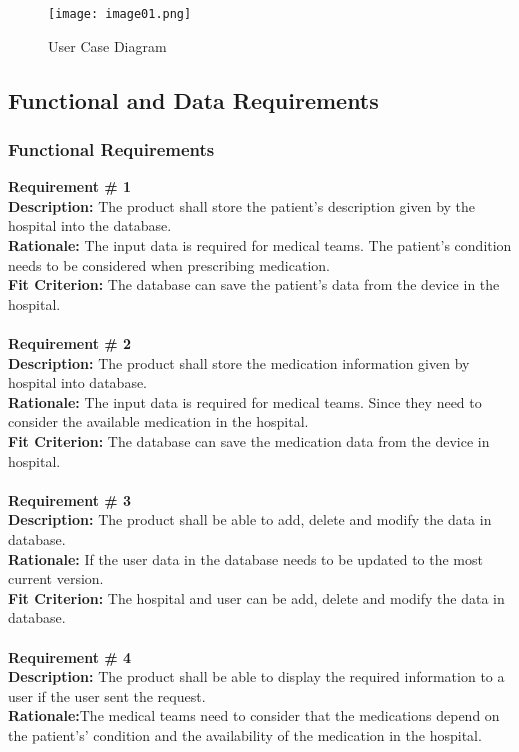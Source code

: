 \documentclass[12pt]{article}
\begin{document}
\begin{figure}[ht]
  \texttt{[image: image01.png]}
  \caption{User Case Diagram}
  \label{fig:User Case Diagram}
\end{figure}

\subsection{Functional and Data Requirements}
\subsubsection{Functional Requirements}
{\bf Requirement \# 1} \\
{\bf Description:} The product shall store the patient’s description given by the hospital into the database.  \\
{\bf Rationale:} The input data is required for medical teams. The patient’s condition needs to be considered when prescribing medication. \\
{\bf Fit Criterion:} The database can save the patient’s data from the device in the hospital. \\ \\
{\bf Requirement \# 2}\\
{\bf Description:} The product shall store the medication information given by hospital into database.  \\
{\bf Rationale:} The input data is required for medical teams. Since they need to consider the available medication in the hospital. \\
{\bf Fit Criterion:} The database can save the medication data from the device in hospital. \\ \\
{\bf Requirement \# 3}\\
{\bf Description:} The product shall be able to add, delete and modify the data in database.  \\
{\bf Rationale:} If the user data in the database needs to be updated to the most current version.\\
{\bf Fit Criterion:} The hospital and user can be add, delete and modify the data in database.\\ \\
{\bf Requirement \# 4}\\
{\bf Description:} The product shall be able to display the required information to a user if the user sent the request.\\
{\bf Rationale:}The medical teams need to consider that the medications depend on the patient's’ condition and the availability of the medication in the hospital.\\
\end{document}
